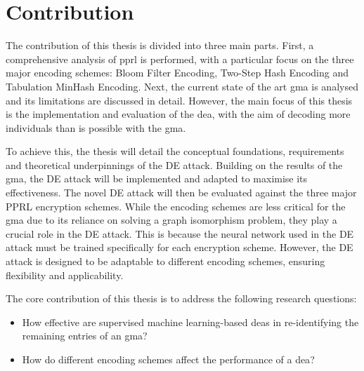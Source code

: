 





\section{Contribution}  \label{sec:contribution}

The contribution of this thesis is divided into three main parts. First, a comprehensive analysis of \ac{pprl} is performed, with a particular focus on the three major encoding schemes: Bloom Filter Encoding, Two-Step Hash Encoding and Tabulation MinHash Encoding. Next, the current state of the art \ac{gma} is analysed and its limitations are discussed in detail. However, the main focus of this thesis is the implementation and evaluation of the \ac{dea}, with the aim of decoding more individuals than is possible with the \ac{gma}.

To achieve this, the thesis will detail the conceptual foundations, requirements and theoretical underpinnings of the DE attack. Building on the results of the \ac{gma}, the DE attack will be implemented and adapted to maximise its effectiveness. The novel DE attack will then be evaluated against the three major PPRL encryption schemes. While the encoding schemes are less critical for the \ac{gma} due to its reliance on solving a graph isomorphism problem, they play a crucial role in the DE attack. This is because the neural network used in the DE attack must be trained specifically for each encryption scheme. However, the DE attack is designed to be adaptable to different encoding schemes, ensuring flexibility and applicability.

The core contribution of this thesis is to address the following research questions:

\begin{itemize}
    \item How effective are supervised machine learning-based \ac{dea}s in re-identifying the remaining entries of an \ac{gma}?
    \item How do different encoding schemes affect the performance of a \ac{dea}?
\end{itemize}



